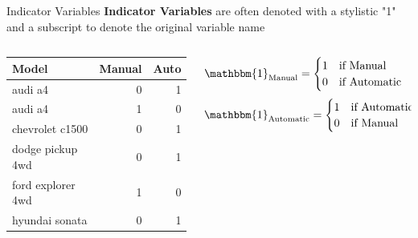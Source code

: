 \documentclass{beamer}
\begin{document}
\begin{frame}{Indicator Variables}
\textbf{Indicator Variables} are often denoted with a stylistic "1" and a subscript to denote the original variable name \vspace{6mm}
\scriptsize
\begin{columns}
\begin{column}{0.45\textwidth}
\begin{table}[ht]
\centering
\begin{tabular}{lrr}
  \hline
Model & Manual & Auto \\ 
  \hline
audi a4 & 0 & 1 \\ 
  audi a4 & 1 & 0 \\ 
  chevrolet c1500  & 0 & 1 \\ 
  dodge pickup 4wd & 0 & 1 \\ 
  ford explorer 4wd & 1 & 0 \\ 
  hyundai sonata & 0 & 1 \\ 
   \hline
\end{tabular}
\end{table}
\end{column}
\begin{column}{0.45\textwidth}  %
\begin{align*}
\mathbbm{1}_{\text{Manual}} = \begin{cases}
1 \quad \text{if Manual}\\ 
0 \quad \text{if Automatic}
\end{cases}
\end{align*}
\begin{align*}
\mathbbm{1}_{\text{Automatic}} = \begin{cases}
1 \quad \text{if Automatic}\\ 
0 \quad \text{if Manual}
\end{cases}
\end{align*}
\end{column}
\end{columns}
\end{frame}
\end{document}
